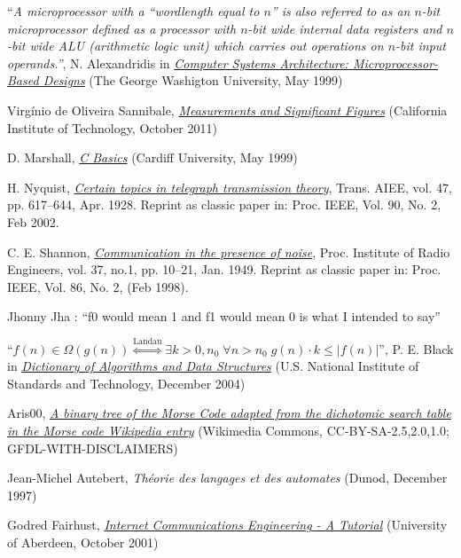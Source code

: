 \documentclass[twocolumn,pre,floats,aps,amsmath,amssymb]{revtex4}
\begin{document}
\begin{thebibliography}{99}
``{\it A microprocessor with a ``wordlength equal to $n$'' is also referred to as an $n$-bit microprocessor defined as a processor with $n$-bit wide internal data registers and $n$-bit wide ALU (arithmetic logic unit) which carries out operations on $n$-bit input operands.''}, N. Alexandridis in {\it \href{http://www.student.seas.gwu.edu/~kallitec/ece201/TextbookFigures/000-Chapter1.pdf}{Computer Systems Architecture: Microprocessor-Based Designs}} (The George Washigton University, May 1999)

Virg\'inio de Oliveira Sannibale, {\it \href{http://www.ligo.caltech.edu/~vsanni/ph3/SignificantFiguresAndMeasurements/SignificantFiguresAndMeasurements.pdf}{Measurements and Significant Figures}} (California Institute of Technology, October 2011)

D. Marshall, {\it \href{http://www.cs.cf.ac.uk/Dave/C/node4.html}{C Basics}} (Cardiff University, May 1999)

H. Nyquist, {\it \href{http://replay.web.archive.org/20060706192816/http://www.loe.ee.upatras.gr/Comes/Notes/Nyquist.pdf}{Certain topics in telegraph transmission theory}}, Trans. AIEE, vol. 47, pp. 617–644, Apr. 1928. Reprint as classic paper in: Proc. IEEE, Vol. 90, No. 2, Feb 2002.

C. E. Shannon, {\it \href{http://www.stanford.edu/class/ee104/shannonpaper.pdf}{Communication in the presence of noise}}, Proc. Institute of Radio Engineers, vol. 37, no.1, pp. 10–21, Jan. 1949. Reprint as classic paper in: Proc. IEEE, Vol. 86, No. 2, (Feb 1998).

 Jhonny Jha : ``f0 would mean 1 and f1 would mean 0 is what I intended to say''

 ``$f(n) \in \Omega \left ( g(n) \right ) \stackrel{\mathrm{Landau}}{\Leftrightarrow} \exists k>0, n_0 \; \forall n>n_0 \; g(n)\cdot k \leq |f(n)|$'', P. E. Black in {\it \href{http://www.nist.gov/dads/}{Dictionary of Algorithms and Data Structures}} (U.S. National Institute of Standards and Technology, December 2004)

 Aris00, {\it \href{http://en.wikipedia.org/wiki/File:Morse_code_tree3.png}{A binary tree of the Morse Code adapted from the dichotomic search table in the Morse code Wikipedia entry}} (Wikimedia Commons, CC-BY-SA-2.5,2.0,1.0; GFDL-WITH-DISCLAIMERS)

Jean-Michel Autebert, {\it Th\'eorie des langages et des automates} (Dunod, December 1997)

Godred Fairhust, {\it \href{http://www.erg.abdn.ac.uk/~gorry/eg3567/phy-pages/nrz.html}{Internet Communications Engineering - A Tutorial}} (University of Aberdeen, October 2001)

\end{thebibliography}
\end{document}
